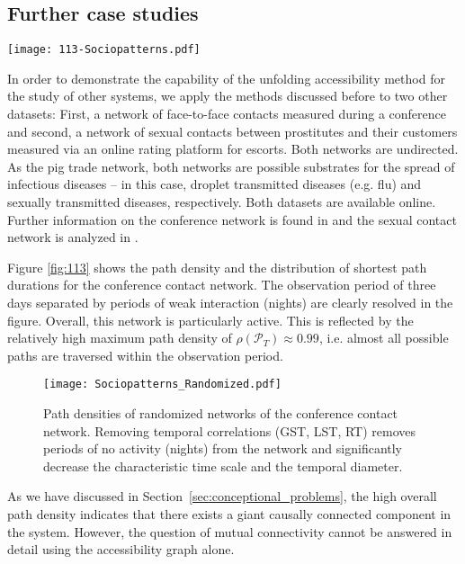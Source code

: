 \subsection{Further case studies}\label{sec:further_cases}
%
\begin{SCfigure}
\texttt{[image: 113-Sociopatterns.pdf]}
\caption{Unfolding accessibility of a conference contact network.
The fast saturation behavior and the high maximum of the path density suggest a high degree of mixing in this system.}
\label{fig:113}
\end{SCfigure}
%
In order to demonstrate the capability of the unfolding accessibility method for the study of other systems, we apply the methods discussed before to two other datasets:
First, a network of face-to-face contacts measured during a conference and second, a network of sexual contacts between prostitutes and their customers measured via an online rating platform for escorts.
Both networks are undirected.
As the pig trade network, both networks are possible substrates for the spread of infectious diseases -- in this case, droplet transmitted diseases (e.g. flu) and sexually transmitted diseases, respectively.
Both datasets are available online.
Further information on the conference network is found in \citep{isella2011,sociopatterns.org} and the sexual contact network is analyzed in \citep{Rocha_pnas}.

Figure \ref{fig:113} shows the path density and the distribution of shortest path durations for the conference contact network.
The observation period of three days separated by periods of weak interaction (nights) are clearly resolved in the figure.
Overall, this network is particularly active.
This is reflected by the relatively high maximum path density of $\rho (\mathcal{P}_T) \approx 0.99$, i.e. almost all possible paths are traversed within the observation period.
%
\begin{figure}[h!]
\begin{center}
\texttt{[image: Sociopatterns\_Randomized.pdf]}
\caption{Path densities of randomized networks of the conference contact network.
Removing temporal correlations (GST, LST, RT) removes periods of no activity (nights) from the network and significantly decrease the characteristic time scale and the temporal diameter.}
\label{fig:113_random}
\end{center}
\end{figure}
%
As we have discussed in Section~\ref{sec:conceptional_problems}, the high overall path density indicates that there exists a giant causally connected component in the system.
However, the question of mutual connectivity cannot be answered in detail using the accessibility graph alone.

